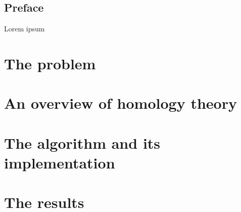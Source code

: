 \documentclass[12pt]{book}
\title{}
\author{Arnau Mas}
\date{}
\begin{document}
\maketitle
\thispagestyle{empty}

\pagestyle{plain}
\frontmatter
{ \small \tableofcontents }

\pagebreak
{}
\section*{Preface}
Lorem ipsum

\mainmatter
\pagestyle{main}

\chapter{The problem}\label{ch:problem}


\chapter{An overview of homology theory}


\chapter{The algorithm and its implementation}


\chapter{The results}


\backmatter
\printbibliography
\end{document}

